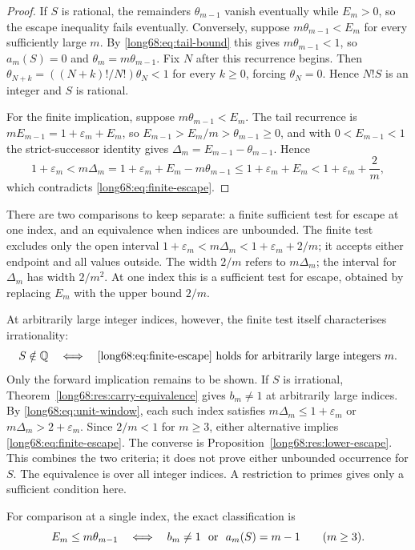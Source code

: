 \documentclass[11pt]{article}
\newcommand{\Ser}{S}
\begin{document}
\begin{proof}
If $\Ser$ is rational, the remainders $\theta_{m-1}$ vanish eventually while
$E_m>0$, so the escape inequality fails eventually.  Conversely, suppose
$m\theta_{m-1}<E_m$ for every sufficiently large $m$.  By
\eqref{long68:eq:tail-bound} this gives $m\theta_{m-1}<1$, so $a_m(\Ser)=0$ and
$\theta_m=m\theta_{m-1}$. Fix $N$ after this recurrence begins.
Then $\theta_{N+k}=((N+k)!/N!)\theta_N<1$ for every $k\ge0$, forcing
$\theta_N=0$. Hence $N!\Ser$ is an integer and $\Ser$ is rational.

For the finite implication, suppose $m\theta_{m-1}<E_m$.  The tail recurrence
is $mE_{m-1}=1+\varepsilon_m+E_m$, so $E_{m-1}>E_m/m>\theta_{m-1}\ge0$, and
with $0<E_{m-1}<1$ the strict-successor identity gives
$\Delta_m=E_{m-1}-\theta_{m-1}$.  Hence
\[
 1+\varepsilon_m<m\Delta_m=1+\varepsilon_m+E_m-m\theta_{m-1}
 \le1+\varepsilon_m+E_m<1+\varepsilon_m+\frac2m,
\]
which contradicts \eqref{long68:eq:finite-escape}.
\end{proof}

There are two comparisons to keep separate: a finite sufficient test
for escape at one index, and an equivalence when indices are unbounded.
The finite test excludes only the open interval
$1+\varepsilon_m<m\Delta_m<1+\varepsilon_m+2/m$; it accepts either endpoint
and all values outside. The width $2/m$ refers to $m\Delta_m$; the interval
for $\Delta_m$ has width $2/m^2$. At one index this is a sufficient test
for escape, obtained by replacing $E_m$ with the upper bound $2/m$.

At arbitrarily large integer indices, however, the finite test itself
characterises irrationality:
\[
 S\notin\mathbb{Q}\quad\Longleftrightarrow\quad
 \text{\eqref{long68:eq:finite-escape} holds for arbitrarily large integers }m.
\]
Only the forward implication remains to be shown. If $S$ is irrational,
Theorem~\ref{long68:res:carry-equivalence} gives $b_m\ne1$ at arbitrarily
large indices. By \eqref{long68:eq:unit-window}, each such index satisfies
$m\Delta_m\le1+\varepsilon_m$ or $m\Delta_m>2+\varepsilon_m$.
Since $2/m<1$ for $m\ge3$, either alternative implies
\eqref{long68:eq:finite-escape}. The converse is Proposition~\ref{long68:res:lower-escape}.
This combines the two criteria; it does not prove either unbounded
occurrence for $S$. The equivalence is over all integer indices. A
restriction to primes gives only a sufficient condition here.

For comparison at a single index, the exact classification is
\begin{equation}\label{long68:eq:escape-classification}
 E_m\le m\theta_{m-1}
 \quad\Longleftrightarrow\quad
 b_m\ne1\ \hbox{ or }\ a_m(\Ser)=m-1
 \qquad(m\ge3).
\end{equation}
\end{document}

